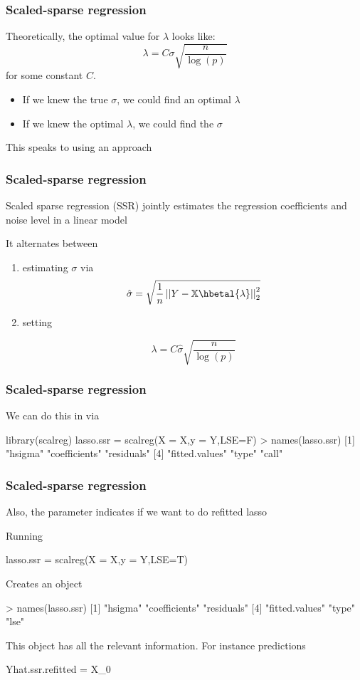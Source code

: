 \documentclass{beamer}
\begin{document}
\begin{frame}[fragile]
\frametitle{Scaled-sparse regression}
Theoretically, the optimal value for $\lambda$ looks like:
\[
\lambda = C \sigma\sqrt{\frac{n}{\log(p)}}
\]
for some constant $C$.

\begin{itemize}
\item If we knew the true $\sigma$, we could find an optimal $\lambda$

\item If we knew the optimal $\lambda$, we could find the $\sigma$
\end{itemize}
\vsp

This speaks to using an  approach


\end{frame}

\begin{frame}[fragile]
\frametitle{Scaled-sparse regression}
\vsp
Scaled sparse regression (SSR) jointly estimates the regression coefficients and noise level in a linear model

\vsp
It alternates between
\begin{enumerate}
\item estimating $\sigma$ via 
\[
\hat\sigma = \sqrt{\frac{1}{n}\norm{Y - \X \hbetal{\lambda}}_2^2}
\]
\item setting 

\[
\lambda = C\hat\sigma\sqrt{\frac{n}{\log(p)}}
\]
\end{enumerate}
\end{frame}


\begin{frame}[fragile]
\frametitle{Scaled-sparse regression}
We can do this in  via
\begin{blockcode}
library(scalreg)
lasso.ssr = scalreg(X = X,y = Y,LSE=F)
> names(lasso.ssr)
[1] "hsigma"        "coefficients"  "residuals"    
[4] "fitted.values" "type"          "call" 
\end{blockcode}

\end{frame}

\begin{frame}[fragile]
\frametitle{Scaled-sparse regression}
Also, the  parameter indicates if we want to do refitted lasso

\vsp
Running
\begin{blockcode}
lasso.ssr = scalreg(X = X,y = Y,LSE=T)
\end{blockcode}
Creates an object 
\begin{blockcode}
> names(lasso.ssr)
[1] "hsigma"        "coefficients"  "residuals"    
[4] "fitted.values" "type"          "lse"
\end{blockcode}
This object has all the relevant information.  For instance predictions
\begin{blockcode}
Yhat.ssr.refitted = X_0 %
\end{blockcode}

\end{frame}
\end{document}
